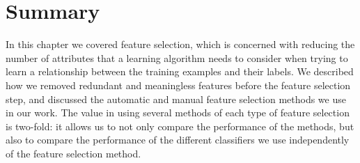 \section{Summary}
In this chapter we covered feature selection, which is concerned with reducing
the number of attributes that a learning algorithm needs to consider when
trying to learn a relationship between the training examples and their labels.
We described how we removed redundant and meaningless features before the
feature selection step, and discussed the automatic and manual feature
selection methods we use in our work. The value in using several methods of
each type of feature selection is two-fold: it allows us to not only compare
the performance of the methods, but also to compare the performance of the
different classifiers we use independently of the feature selection method.
